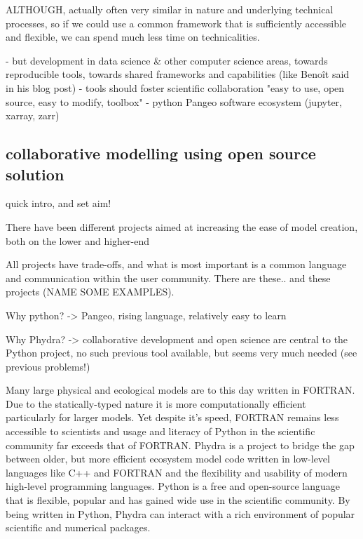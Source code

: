 \documentclass[template.tex]{subfiles}
\begin{document}
ALTHOUGH, actually often very similar in nature and underlying technical processes, so if we could use a common framework that is sufficiently accessible and flexible, we can spend much less time on technicalities.

- but development in data science & other computer science areas, towards reproducible tools, towards shared frameworks and capabilities (like Benoît said in his blog post)
- tools should foster scientific collaboration
"easy to use, open source, easy to modify, toolbox"
- python Pangeo software ecosystem (jupyter, xarray, zarr)

\subsection{collaborative modelling using open source solution}

quick intro, and set aim!

There have been different projects aimed at increasing the ease of model creation, both on the lower and higher-end

All projects have trade-offs, and what is most important is a common language and communication within the user community.
There are these.. and these projects (NAME SOME EXAMPLES).


Why python? -> Pangeo, rising language, relatively easy to learn


Why Phydra? -> collaborative development and open science are central to the Python project, no such previous tool available, but seems very much needed (see previous problems!)

Many large physical and ecological models are to this day written in FORTRAN. Due to the statically-typed nature it is more computationally efficient particularly for larger models. Yet despite it's speed, FORTRAN remains less accessible to scientists and usage and literacy of Python in the scientific community far exceeds that of FORTRAN.
Phydra is a project to bridge the gap between older, but more efficient ecosystem model code written in low-level languages like C++ and FORTRAN and the flexibility and usability of modern high-level programming languages. Python is a free and open-source language that is flexible, popular and has gained wide use in the scientific community. By being written in Python, Phydra can interact with a rich environment of popular scientific and numerical packages. 
\end{document}
